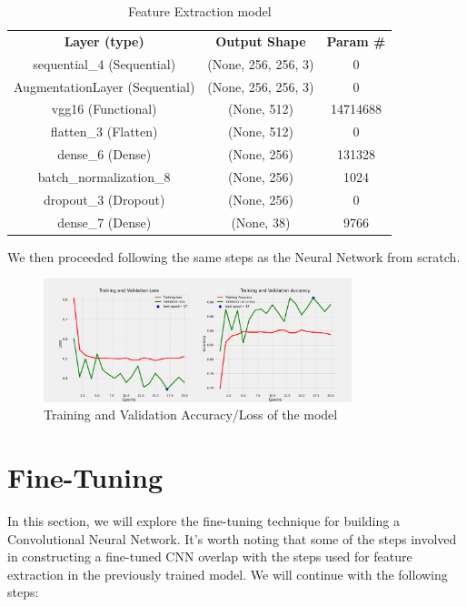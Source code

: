 \begin{table}[h]
	\centering
	\begin{tabular}{ccc}
	\hline
	\textbf{Layer (type)}          & \textbf{Output Shape} & \textbf{Param \#}     \\ 
	sequential\_4 (Sequential)     & (None, 256, 256, 3)  & 0                     \\ 
	AugmentationLayer (Sequential) & (None, 256, 256, 3)  & 0                     \\ 
	vgg16 (Functional)             & (None, 512)          & 14714688              \\ 
	flatten\_3 (Flatten)           & (None, 512)          & 0                     \\ 
	dense\_6 (Dense)               & (None, 256)          & 131328                \\ 
	batch\_normalization\_8        & (None, 256)          & 1024                  \\ 
	dropout\_3 (Dropout)           & (None, 256)          & 0                     \\ 
	dense\_7 (Dense)               & (None, 38)           & 9766                  \\ 
	\hline
	\end{tabular}
	\caption{Feature Extraction model}
	\label{tab:model_details}
\end{table}
	

We then proceeded following the same steps as the Neural Network from scratch.

\begin{figure}[H]
    \centering
    \includegraphics[width= 0.8\textwidth]{assets/FExtraction/FE_base_256d.png} 
    \caption{Training and Validation Accuracy/Loss of the model} 
    \label{fig:immagine}
\end{figure}

\section{Fine-Tuning}

In this section, we will explore the fine-tuning technique for building a Convolutional Neural Network. 
It's worth noting that some of the steps involved in constructing a fine-tuned CNN overlap with the steps used for 
feature extraction in the previously trained model. We will continue with the following steps:

